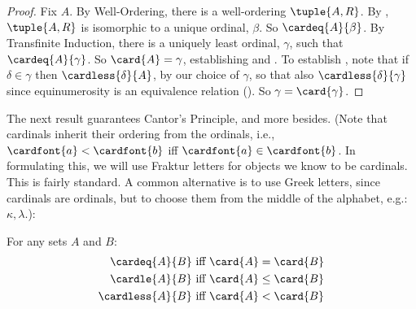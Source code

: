 \documentclass[../../../include/open-logic-section]{subfiles}
\begin{document}
\begin{proof}
Fix $A$. By Well-Ordering, there is a well-ordering $\tuple{A, R}$. By
, $\tuple{A,
R}$ is isomorphic to a unique ordinal, $\beta$. So
$\cardeq{A}{\beta}$. By Transfinite Induction, there is a uniquely
least ordinal, $\gamma$, such that $\cardeq{A}{\gamma}$. So $\card{A}
= \gamma$, establishing  and .
To establish , note that if $\delta \in \gamma$ then
$\cardless{\delta}{A}$, by our choice of $\gamma$, so that also
$\cardless{\delta}{\gamma}$ since equinumerosity is an equivalence
relation (). So $\gamma =
\card{\gamma}$. 
\end{proof}

The next result guarantees Cantor's Principle, and more besides.
(Note that cardinals inherit their ordering from the ordinals, i.e.,
$\cardfont{a} < \cardfont{b}$ iff $\cardfont{a} \in \cardfont{b}$. In
formulating this, we will use Fraktur letters for objects we know to be
cardinals. This is fairly standard. A common alternative is to use
Greek letters, since cardinals are ordinals, but to choose them from
the middle of the alphabet, e.g.: $\kappa, \lambda$.):
\begin{lem}
For any sets $A$ and $B$:
\begin{align*}
	\cardeq{A}{B} &\text{ iff } \card{A} = \card{B}\\
	\cardle{A}{B} &\text{ iff } \card{A} \leq \card{B}\\
	\cardless{A}{B}&\text{ iff } \card{A} < \card{B}
\end{align*}
\end{lem}
\end{document}

